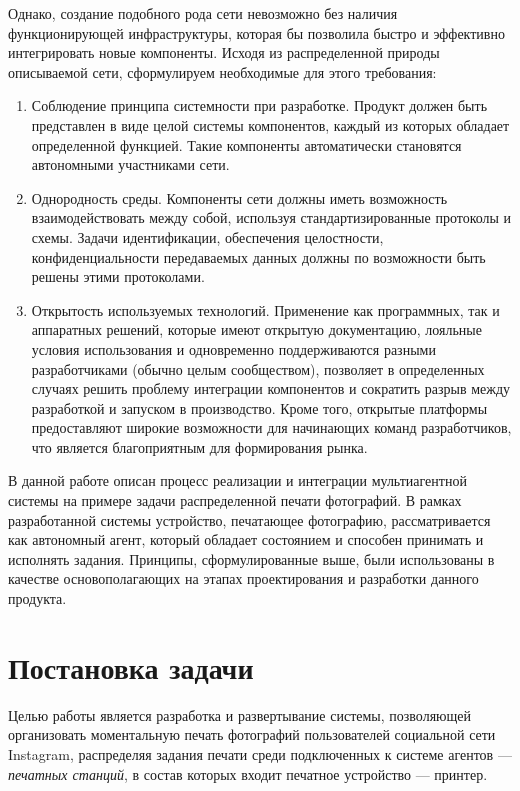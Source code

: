 \documentclass[a4paper,14pt,href]{article}
\begin{document}
Однако, создание подобного рода сети невозможно без наличия функционирующей инфраструктуры, которая бы позволила быстро и эффективно интегрировать новые компоненты. Исходя из распределенной природы описываемой сети, сформулируем необходимые для этого требования:

\begin{enumerate}
  \item Соблюдение принципа системности при разработке\cite{SystemPrinciple}. Продукт должен быть представлен в виде целой системы компонентов, каждый из которых обладает определенной функцией. Такие компоненты автоматически становятся автономными участниками сети.

  \item Однородность среды. Компоненты сети должны иметь возможность взаимодействовать между собой, используя стандартизированные протоколы и схемы. Задачи идентификации, обеспечения целостности, конфиденциальности передаваемых данных должны по возможности быть решены этими протоколами.

  \item Открытость используемых технологий. Применение как программных, так и аппаратных решений, которые имеют открытую документацию, лояльные  условия использования и одновременно поддерживаются разными разработчиками (обычно целым сообществом), позволяет в определенных случаях решить проблему интеграции компонентов и сократить разрыв между разработкой и запуском в производство. Кроме того, открытые платформы предоставляют широкие возможности для начинающих команд разработчиков, что является благоприятным для формирования рынка.
\end{enumerate}

В данной работе описан процесс реализации и интеграции муль\-тиагентной системы на примере задачи распределенной печати фотографий. В рамках разработанной системы устройство, печатающее фотографию, рассматривается как автономный агент, который обладает состоянием и способен принимать и исполнять задания. Принципы, сформулированные выше, были использованы в качестве основополагающих на этапах проектирования и разработки данного продукта.

\newpage
\section{Постановка задачи}
Целью работы является разработка и развертывание системы, позволяющей организовать моментальную печать фотографий пользователей социальной сети Instagram, распределяя задания печати среди подключенных к системе агентов --- \textit{печатных станций}, в состав которых входит печатное устройство --- принтер.
\end{document}
